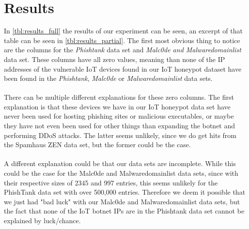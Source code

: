 \documentclass[a4paper,10pt]{article}
\begin{document}

\section{Results} \label{sec:results}

In \autoref{tbl:results_full} the results of our experiment can be seen, an excerpt of that table can be seen in 
\autoref{tbl:results_partial}. The first most obvious thing to notice are the
columns for the \textit{Phishtank} data set and \textit{Malc0de and Malwaredomainlist} data set. These columns 
have all zero values, meaning than none of the IP addresses of the vulnerable IoT devices found in our IoT honeypot 
dataset have been found in the \textit{Phishtank}, \textit{Malc0de} or \textit{Malwaredomainlist} data sets. 
\\\\
There can be multiple different explanations for these zero columns. The first explanation is that these devices we have
in our IoT honeypot data set have never been used for hosting phishing sites or malicious executables, or maybe they have
not even been used for other things than expanding the botnet and performing DDoS attacks. The latter seems unlikely, 
since we do get hits from the Spamhaus ZEN data set, but the former could be the case. 
\\\\
A different explanation could be that our data sets are incomplete. While this could be the case  for the Malc0de and
Malwaredomainlist data sets, since with their respective sizes of 2345 and 997 entries, this seems unlikely for the
PhishTank data set with over 500,000 entries.  Therefore we deem it possible that we just had "bad luck" with our
Malc0de and Malwaredomainlist data sets, but the fact that none of the IoT botnet IPs are in the Phishtank data set 
cannot be explained by luck/chance.
\end{document}
